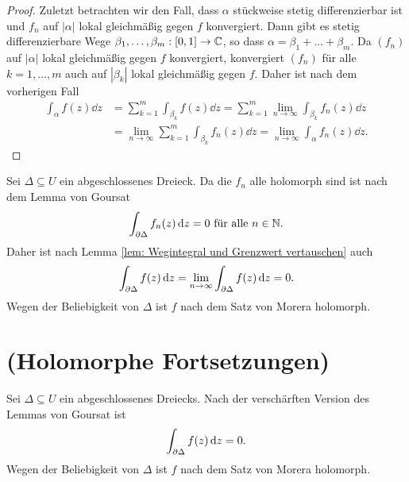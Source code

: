 \documentclass[a4paper,10pt]{article}
\begin{document}
\begin{proof}
Zuletzt betrachten wir den Fall, dass $\alpha$ stückweise stetig differenzierbar ist und $f_n$ auf $|\alpha|$ lokal gleichmäßig gegen $f$ konvergiert. Dann gibt es stetig differenzierbare Wege $\beta_1, \ldots, \beta_m : [0,1] \to \mathbb{C}$, so dass $\alpha = \beta_1 + \ldots + \beta_m$. Da $(f_n)$ auf $|\alpha|$ lokal gleichmäßig gegen $f$ konvergiert, konvergiert $(f_n)$ für alle $k = 1, \ldots, m$ auch auf $|\beta_k|$ lokal gleichmäßig gegen $f$. Daher ist nach dem vorherigen Fall
\begin{align*}
 \int_\alpha f(z) \dd{z}
 &= \sum_{k=1}^m \int_{\beta_k} f(z) \dd{z}
 = \sum_{k=1}^m \lim_{n \to \infty} \int_{\beta_k} f_n(z) \dd{z} \\
 &= \lim_{n \to \infty} \sum_{k=1}^m \int_{\beta_k} f_n(z) \dd{z}
 = \lim_{n \to \infty} \int_\alpha f_n(z) \dd{z}.
\end{align*}
\end{proof}

Sei $\Delta \subseteq U$ ein abgeschlossenes Dreieck. Da die $f_n$ alle holomorph sind ist nach dem Lemma von Goursat
\[
 \int_{\partial \Delta} f_n(z) \,\text{d}z = 0 \text{ für alle } n \in \mathbb{N}.
\]
Daher ist nach Lemma \ref{lem: Wegintegral und Grenzwert vertauschen} auch
\[
 \int_{\partial \Delta} f(z) \,\text{d}z
 = \lim_{n \to \infty} \int_{\partial \Delta} f(z) \,\text{d}z
 = 0.
\]
Wegen der Beliebigkeit von $\Delta$ ist $f$ nach dem Satz von Morera holomorph.





\section{(Holomorphe Fortsetzungen)}
Sei $\Delta \subseteq U$ ein abgeschlossenes Dreiecks. Nach der verschärften Version des Lemmas von Goursat ist
\[
 \int_{\partial \Delta} f(z) \,\text{d}z = 0.
\]
Wegen der Beliebigkeit von $\Delta$ ist $f$ nach dem Satz von Morera holomorph.
\end{document}
